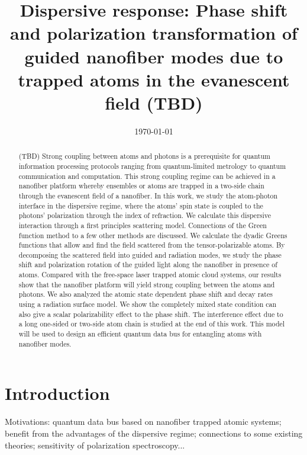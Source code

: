 \documentclass[preprint,pra,onecolumn]{revtex4-1} %
\begin{document}
\title{Dispersive response: Phase shift and polarization transformation of guided nanofiber modes due to trapped atoms in the evanescent field (TBD)}
\author{}
\date{\today}


\begin{abstract}
(TBD) Strong coupling between atoms and photons is a prerequisite for quantum information processing protocols ranging from quantum-limited metrology to quantum communication and computation.  This strong coupling regime can be achieved in a nanofiber platform whereby ensembles or atoms are trapped in a two-side chain through the evanescent field of a nanofiber.  In this work, we study the atom-photon interface in the dispersive regime, where the atoms' spin state is coupled to the photons' polarization through the index of refraction. We calculate this dispersive interaction through a first principles scattering model. Connections of the Green function method to a few other methods are discussed.  We calculate the dyadic Greens functions that allow and find the field scattered from the tensor-polarizable atoms. By decomposing the scattered field into guided and radiation modes, we study the phase shift and polarization rotation of the guided light along the nanofiber in presence of atoms. Compared with the free-space laser trapped atomic cloud systems, our results show that the nanofiber platform will yield strong coupling between the atoms and photons. We also analyzed the atomic state dependent phase shift and decay rates using a radiation surface model. We show the completely mixed state condition can also give a scalar polarizability effect to the phase shift. The interference effect due to a long one-sided or two-side atom chain is studied at the end of this work. This model will be used to design an efficient quantum data bus for entangling atoms with nanofiber modes.   
\end{abstract}

\maketitle

\section{Introduction}

\bigskip
Motivations: quantum data bus based on nanofiber trapped atomic systems; benefit from the advantages of the dispersive regime; connections to some existing theories; sensitivity of polarization spectroscopy...
\end{document}
